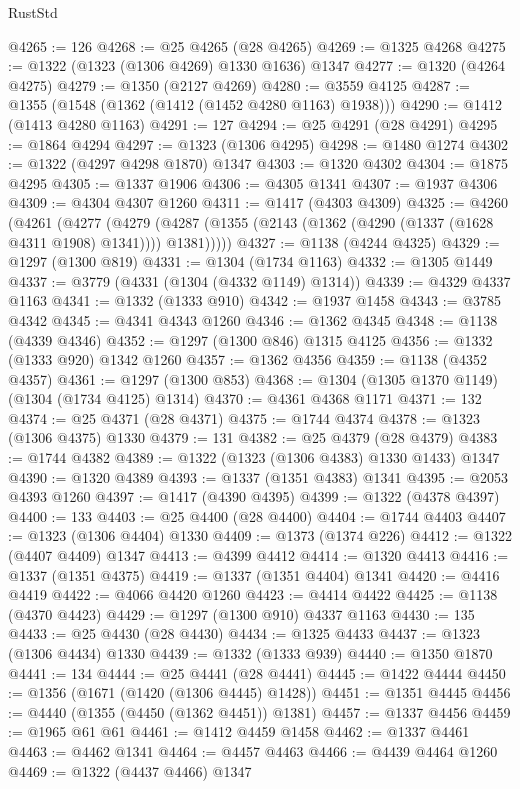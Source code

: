 \begin{lexlean}{RustStd}
\begin{coremodule}
@4265 := 126
@4268 := @25 @4265 (@28 @4265)
@4269 := @1325 @4268
@4275 := @1322 (@1323 (@1306 @4269) @1330 @1636) @1347
@4277 := @1320 (@4264 @4275)
@4279 := @1350 (@2127 @4269)
@4280 := @3559 @4125
@4287 := @1355 (@1548 (@1362 (@1412 (@1452 @4280 @1163) @1938)))
@4290 := @1412 (@1413 @4280 @1163)
@4291 := 127
@4294 := @25 @4291 (@28 @4291)
@4295 := @1864 @4294
@4297 := @1323 (@1306 @4295)
@4298 := @1480 @1274
@4302 := @1322 (@4297 @4298 @1870) @1347
@4303 := @1320 @4302
@4304 := @1875 @4295
@4305 := @1337 @1906
@4306 := @4305 @1341
@4307 := @1937 @4306
@4309 := @4304 @4307 @1260
@4311 := @1417 (@4303 @4309)
@4325 := @4260
    (@4261
      (@4277
        (@4279 (@4287 (@1355 (@2143 (@1362 (@4290 (@1337 (@1628 @4311 @1908) @1341)))) @1381)))))
@4327 := @1138 (@4244 @4325)
@4329 := @1297 (@1300 @819)
@4331 := @1304 (@1734 @1163)
@4332 := @1305 @1449
@4337 := @3779 (@4331 (@1304 (@4332 @1149) @1314))
@4339 := @4329 @4337 @1163
@4341 := @1332 (@1333 @910)
@4342 := @1937 @1458
@4343 := @3785 @4342
@4345 := @4341 @4343 @1260
@4346 := @1362 @4345
@4348 := @1138 (@4339 @4346)
@4352 := @1297 (@1300 @846) @1315 @4125
@4356 := @1332 (@1333 @920) @1342 @1260
@4357 := @1362 @4356
@4359 := @1138 (@4352 @4357)
@4361 := @1297 (@1300 @853)
@4368 := @1304 (@1305 @1370 @1149) (@1304 (@1734 @4125) @1314)
@4370 := @4361 @4368 @1171
@4371 := 132
@4374 := @25 @4371 (@28 @4371)
@4375 := @1744 @4374
@4378 := @1323 (@1306 @4375) @1330
@4379 := 131
@4382 := @25 @4379 (@28 @4379)
@4383 := @1744 @4382
@4389 := @1322 (@1323 (@1306 @4383) @1330 @1433) @1347
@4390 := @1320 @4389
@4393 := @1337 (@1351 @4383) @1341
@4395 := @2053 @4393 @1260
@4397 := @1417 (@4390 @4395)
@4399 := @1322 (@4378 @4397)
@4400 := 133
@4403 := @25 @4400 (@28 @4400)
@4404 := @1744 @4403
@4407 := @1323 (@1306 @4404) @1330
@4409 := @1373 (@1374 @226)
@4412 := @1322 (@4407 @4409) @1347
@4413 := @4399 @4412
@4414 := @1320 @4413
@4416 := @1337 (@1351 @4375)
@4419 := @1337 (@1351 @4404) @1341
@4420 := @4416 @4419
@4422 := @4066 @4420 @1260
@4423 := @4414 @4422
@4425 := @1138 (@4370 @4423)
@4429 := @1297 (@1300 @910) @4337 @1163
@4430 := 135
@4433 := @25 @4430 (@28 @4430)
@4434 := @1325 @4433
@4437 := @1323 (@1306 @4434) @1330
@4439 := @1332 (@1333 @939)
@4440 := @1350 @1870
@4441 := 134
@4444 := @25 @4441 (@28 @4441)
@4445 := @1422 @4444
@4450 := @1356 (@1671 (@1420 (@1306 @4445) @1428))
@4451 := @1351 @4445
@4456 := @4440 (@1355 (@4450 (@1362 @4451)) @1381)
@4457 := @1337 @4456
@4459 := @1965 @61 @61
@4461 := @1412 @4459 @1458
@4462 := @1337 @4461
@4463 := @4462 @1341
@4464 := @4457 @4463
@4466 := @4439 @4464 @1260
@4469 := @1322 (@4437 @4466) @1347

\end{coremodule}
\end{lexlean}
